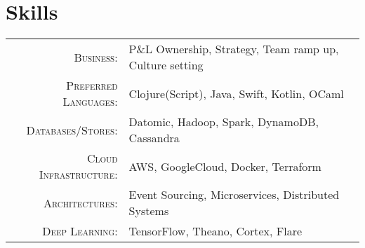 \documentclass[a4paper,10pt]{article}
\begin{document}
\section{Skills}
\begin{tabular}{rl}
  \textsc{Business:} & P\&L Ownership, Strategy, Team ramp up, Culture setting \\

  \textsc{Preferred Languages:} & Clojure(Script), Java, Swift, Kotlin, OCaml \\

  \textsc{Databases/Stores:} & Datomic, Hadoop, Spark, DynamoDB, Cassandra \\

  \textsc{Cloud Infrastructure:} & AWS, GoogleCloud, Docker, Terraform \\

  \textsc{Architectures:} & Event Sourcing, Microservices, Distributed
  Systems \\

  \textsc{Deep Learning:} & TensorFlow, Theano, Cortex, Flare \\
\end{tabular}



\end{document}
